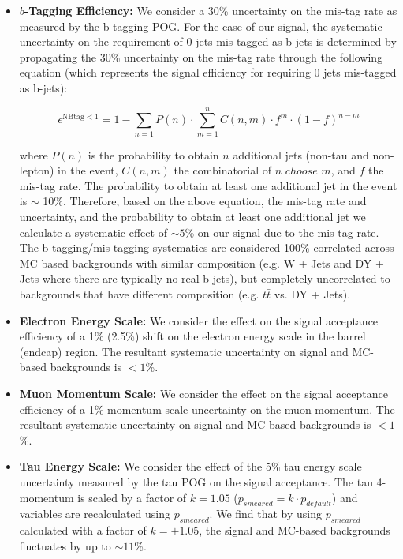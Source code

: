 \begin{itemize}
  \item \textbf{$b$-Tagging Efficiency:} We consider a 30\% uncertainty on the mis-tag rate as measured by the 
b-tagging POG\cite{CMS_PAS_BTV_11-001}. For the case of our signal, the systematic 
uncertainty on the requirement of 0 jets mis-tagged as b-jets is determined by propagating the 30\% uncertainty on the 
mis-tag rate through the following equation (which represents the signal efficiency for requiring 0 
jets mis-tagged as b-jets):

\begin{equation}\label{eq:nttbar}
  \epsilon^{\textrm{NBtag} < 1} = 1 - \sum_{n=1} P(n) \cdot \sum_{m=1}^{n} C(n,m) \cdot f^{m} \cdot (1-f)^{n-m}
\end{equation}

where $P(n)$ is the probability to obtain $n$ additional jets (non-tau and non-lepton) in the event, $C(n,m)$ the 
combinatorial of $n$ $choose$ $m$, and $f$ the mis-tag rate. The probability to 
obtain at least one additional jet in the event is $\sim$ 10\%. Therefore, based on the above equation, the 
mis-tag rate and uncertainty, and the probability to obtain at least one additional jet we calculate a 
systematic effect of $\sim 5$\% on our signal due to the mis-tag rate. The b-tagging/mis-tagging systematics are considered 100\% correlated across MC based 
backgrounds with similar composition (e.g. W + Jets and DY + Jets where there are typically no real b-jets), but completely uncorrelated to backgrounds that have 
different composition (e.g. $t\bar{t}$ vs. DY + Jets).

  \item \textbf{Electron Energy Scale:} We consider the effect on the signal acceptance efficiency of a 1\% (2.5\%) shift on the electron
  energy scale in the barrel (endcap) region. The resultant systematic uncertainty on signal and MC-based backgrounds is $< 1$\%.

  \item \textbf{Muon Momentum Scale:} We consider the effect on the signal acceptance efficiency of a 1\% momentum scale uncertainty on the
  muon momentum. The resultant systematic uncertainty on signal and MC-based backgrounds is $< 1$\%.

  \item \textbf{Tau Energy Scale:} We consider the effect of the 5\% tau energy scale uncertainty measured by the tau 
POG on the signal acceptance. The tau 4-momentum is scaled by a factor of $k=1.05$ ($p_{smeared} = k \cdot 
p_{default}$) and variables are recalculated using $p_{smeared}$. We find that by using $p_{smeared}$ calculated with 
a factor of $k=\pm 1.05$, the signal and MC-based backgrounds fluctuates by up to $\sim 11$\%. 


\end{itemize}
